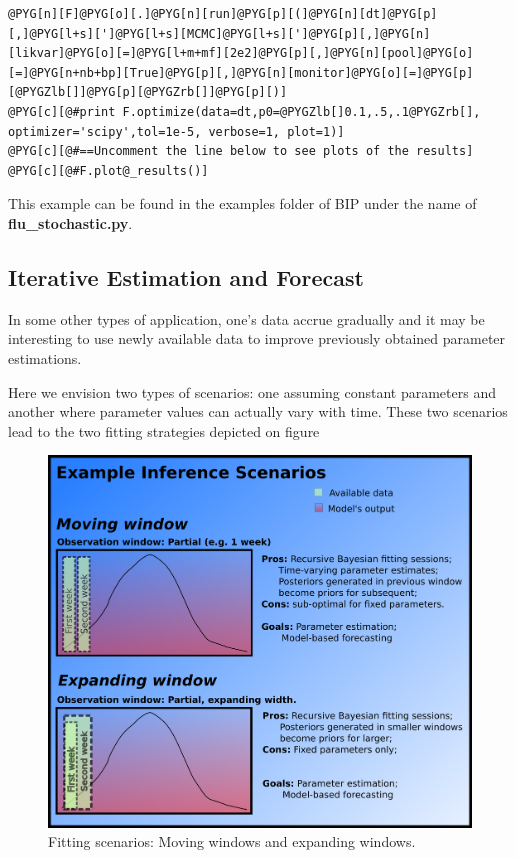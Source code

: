 \documentclass[a4paper,10pt,english]{manual}
\begin{document}
\begin{Verbatim}[commandchars=@\[\]]
@PYG[n][F]@PYG[o][.]@PYG[n][run]@PYG[p][(]@PYG[n][dt]@PYG[p][,]@PYG[l+s][']@PYG[l+s][MCMC]@PYG[l+s][']@PYG[p][,]@PYG[n][likvar]@PYG[o][=]@PYG[l+m+mf][2e2]@PYG[p][,]@PYG[n][pool]@PYG[o][=]@PYG[n+nb+bp][True]@PYG[p][,]@PYG[n][monitor]@PYG[o][=]@PYG[p][@PYGZlb[]]@PYG[p][@PYGZrb[]]@PYG[p][)]
@PYG[c][@#print F.optimize(data=dt,p0=@PYGZlb[]0.1,.5,.1@PYGZrb[], optimizer='scipy',tol=1e-5, verbose=1, plot=1)]
@PYG[c][@#==Uncomment the line below to see plots of the results]
@PYG[c][@#F.plot@_results()]
\end{Verbatim}

This example can be found in the examples folder of BIP under the name of \textbf{flu\_stochastic.py}.


\subsection{Iterative Estimation and Forecast}

In some other types of application, one's data accrue gradually and it may be interesting to use newly available data to improve previously obtained parameter estimations.

Here we envision two types of scenarios: one assuming constant parameters and another where parameter values can actually vary with time. These two scenarios lead to the two fitting strategies depicted on figure
\begin{figure}[htbp]
\centering

\includegraphics[width=15cm]{Inference_scenarios2.png}
\caption{Fitting scenarios: Moving windows and expanding windows.}\end{figure}
\end{document}
